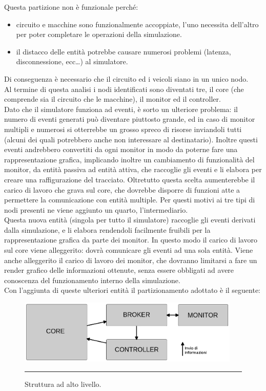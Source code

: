 Questa partizione non è funzionale perché:
\begin{itemize}
\item circuito e macchine sono funzionalmente accoppiate, l'uno necessita dell'altro per poter completare le operazioni della simulazione.
\item il distacco delle entità potrebbe causare numerosi problemi (latenza, disconnessione, ecc…) al simulatore. 
\end{itemize}
Di conseguenza è necessario che il circuito ed i veicoli siano in un unico nodo. \\
Al termine di questa analisi i nodi identificati sono diventati tre, il core (che comprende sia il circuito che le macchine), il monitor ed il controller. \\
Dato che il simulatore funziona ad eventi, è sorto un ulteriore problema: il numero di eventi generati può diventare piuttosto grande, ed in caso di monitor multipli e numerosi si otterrebbe un grosso spreco di risorse inviandoli tutti (alcuni dei quali potrebbero anche non interessare al destinatario). Inoltre questi eventi andrebbero convertiti da ogni monitor in modo da poterne fare una rappresentazione grafica, implicando inoltre un cambiamento di funzionalità del monitor, da entità passiva ad entità attiva, che raccoglie gli eventi e li elabora per creare una raffigurazione del tracciato.
Oltretutto questa scelta aumenterebbe il carico di lavoro che grava sul core, che dovrebbe disporre di funzioni atte a permettere la comunicazione con entità multiple.
Per questi motivi ai tre tipi di nodi presenti ne viene aggiunto un quarto, l’intermediario. \\
Questa nuova entità (singola per tutto il simulatore) raccoglie gli eventi derivati dalla simulazione, e li elabora rendendoli facilmente fruibili per la rappresentazione grafica da parte dei monitor. In questo modo il carico di lavoro sul core viene alleggerito: dovrà comunicare gli eventi ad una sola entità. Viene anche alleggerito il carico di lavoro dei monitor, che dovranno limitarsi a fare un render grafico delle informazioni ottenute, senza essere obbligati ad avere conoscenza del funzionamento interno della simulazione.
\\
Con l'aggiunta di queste ulteriori entità il partizionamento adottato è il seguente:
\begin{figure}[htbp]
	\centering
		\includegraphics[keepaspectratio = true, width = 400px] {Pictures/nodes}
		\rule{35em}{0.5pt}
	\caption[Struttura]{Struttura ad alto livello.}
	\label{fig:Struttura}
\end{figure}

